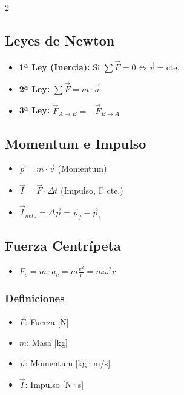 \documentclass[11pt]{article}
\begin{document}
\begin{multicols}{2}
\begin{tcolorbox}[title=Dinámica Lineal]
\subsection*{Leyes de Newton}
\begin{itemize}
    \item \textbf{1ª Ley (Inercia):} Si $\sum \vec{F} = 0 \iff \vec{v} = \text{cte.}$
    \item \textbf{2ª Ley:} $\sum \vec{F} = m \cdot \vec{a}$
    \item \textbf{3ª Ley:} $\vec{F}_{A \to B} = - \vec{F}_{B \to A}$
\end{itemize}

\subsection*{Momentum e Impulso}
\begin{itemize}
    \item $\vec{p} = m \cdot \vec{v}$ (Momentum)
    \item $\vec{I} = \vec{F} \cdot \Delta t$ (Impulso, F cte.)
    \item $\vec{I}_{neto} = \Delta \vec{p} = \vec{p}_f - \vec{p}_i$
\end{itemize}

\subsection*{Fuerza Centrípeta}
\begin{itemize}
    \item $F_c = m \cdot a_c = m \frac{v^2}{r} = m \omega^2 r$
\end{itemize}

\subsubsection*{Definiciones}
\begin{itemize}
    \item $\vec{F}$: Fuerza [N]
    \item $m$: Masa [kg]
    \item $\vec{p}$: Momentum [kg·m/s]
    \item $\vec{I}$: Impulso [N·s]
\end{itemize}
\end{tcolorbox}



\end{multicols}
\end{document}

